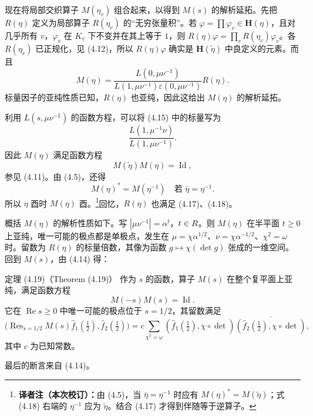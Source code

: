 现在将局部交织算子 $M(\eta_v)$ 组合起来，以得到 $M(s)$ 的解析延拓。先把
$R(\eta)$ 定义为局部算子 $R(\eta_v)$ 的“无穷张量积”。若
$\varphi=\prod\varphi_v\in\mathbf H(\eta)$，且对几乎所有 $v$，$\varphi_v$ 在 $K_v$ 下不变并在其上等于 $1$，则
$R(\eta)\varphi=\prod_vR(\eta_v)\varphi_v$。各 $R(\eta_v)$ 已正规化，见 (4.12)，所以
$R(\eta)\varphi$ 确实是 $\mathbf H(\widetilde\eta)$ 中良定义的元素。而且
\begin{equation}
 M(\eta)=\frac{L(0,\mu\nu^{-1})}{L(1,\mu\nu^{-1})\varepsilon(0,\mu\nu^{-1})}R(\eta).\tag{4.15}
\end{equation}
标量因子的亚纯性质已知，$R(\eta)$ 也亚纯，因此这给出 $M(\eta)$ 的解析延拓。

利用 $L(s,\mu\nu^{-1})$ 的函数方程，可以将 (4.15) 中的标量写为
\begin{equation}
 \frac{L(1,\mu^{-1}\nu)}{L(1,\mu\nu^{-1})}.\tag{4.16}
\end{equation}
因此 $M(\eta)$ 满足函数方程
\begin{equation}
 M(\widetilde\eta)M(\eta)=\operatorname{Id},\tag{4.17}
\end{equation}
参见 (4.11)。由 (4.5)，还得
\begin{equation}
 M(\eta)^*=M(\eta^{-1})\quad\text{若 }\bar\eta=\eta^{-1}.\tag{4.18}
\end{equation}
所以 $\eta$ 酉时 $M(\eta)$ 酉。\footnote{\textbf{译者注（本次校订）：}由 (4.5)，当 $\bar\eta=\eta^{-1}$ 时应有 $M(\eta)^*=M(\widetilde\eta)$；式 (4.18) 右端的 $\eta^{-1}$ 应为 $\widetilde\eta$。结合 (4.17) 才得到伴随等于逆算子。}回忆，$R(\eta)$ 也满足 (4.17)、(4.18)。

概括 $M(\eta)$ 的解析性质如下。写 $|\mu\nu^{-1}|=\alpha^t$，$t\in R$。则
$M(\eta)$ 在半平面 $t\ge0$ 上亚纯，唯一可能的极点都是单极点，发生在
$\mu=\chi\alpha^{1/2}$、$\nu=\chi\alpha^{-1/2}$、$\chi^2=\omega$ 时。留数为
$R(\eta)$ 的标量倍数，其像为函数 $g\mapsto\chi(\det g)$ 张成的一维空间。回到 $M(s)$，由
(4.14) 得：
\begin{originaltheorem}{定理 (4.19)（Theorem (4.19)）}
作为 $s$ 的函数，算子 $M(s)$ 在整个复平面上亚纯，满足函数方程
\begin{equation}
 M(-s)M(s)=\operatorname{Id}.\tag{4.20}
\end{equation}
它在 $\operatorname{Re}s\ge0$ 中唯一可能的极点位于 $s=1/2$，其留数满足
\[
 \bigl(\operatorname{Res}_{s=1/2}M(s)\widehat f_1(\tfrac12),\widehat f_2(\tfrac12)\bigr)
 =c\sum_{\chi^2=\omega}(\widehat f_1(\tfrac12),\chi\circ\det)
 \overline{(\widehat f_2(\tfrac12),\chi\circ\det)},
\]
其中 $c$ 为已知常数。
\end{originaltheorem}
最后的断言来自 (4.14)。

